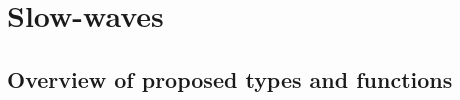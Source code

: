 
\chapter{Slow-waves} %

\label{Chapter2} %
\label{review} %



\section{Overview of proposed types and functions}
\label{overview_of_functions_and_types}

